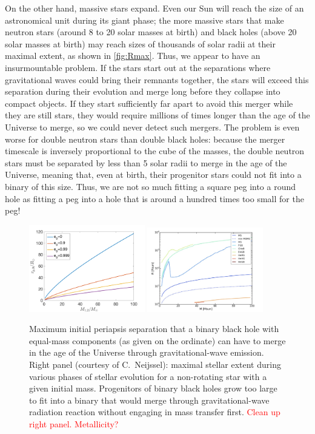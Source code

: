\documentclass[iop,onecolumn]{revtex4}
\newcommand{\todo}[1]{\textcolor{red}{#1}}
\begin{document}
On the other hand, massive stars expand.  Even our Sun will reach the size of an astronomical unit during its giant phase; the more massive stars that make neutron stars (around 8 to 20 solar masses at birth) and black holes (above 20 solar masses at birth) may reach sizes of thousands of solar radii at their maximal extent, as shown in \autoref{fig:Rmax}.  Thus, we appear to have an insurmountable problem.  If the stars start out at the separations where gravitational waves could bring their remnants together, the stars will exceed this separation during their evolution and merge long before they collapse into compact objects. If they start sufficiently far apart to avoid this merger while they are still stars, they would require millions of times longer than the age of the Universe to merge, so we could never detect such mergers.  The problem is even worse for double neutron stars than double black holes: because the merger timescale is inversely proportional to the cube of the masses, the double neutron stars must be separated by less than 5 solar radii to merge in the age of the Universe, meaning that, even at birth, their progenitor stars could not fit into a binary of this size.  Thus, we are not so much fitting a square peg into a round hole as fitting a peg into a hole that is around a hundred times too small for the peg!

\begin{figure}
	\centering
	\includegraphics[width=0.45\textwidth]{M-rp.png}
	\includegraphics[width=0.45\textwidth]{StellarExpansion.png}
	\caption{Maximum initial periapsis separation that a binary black hole with equal-mass components (as given on the ordinate) can have to merge in the age of the Universe through gravitational-wave emission.	\label{fig:periapsis}  Right panel (courtesy of C.~Neijssel): maximal stellar extent during various phases of stellar evolution for a non-rotating star with a given initial mass. \label{fig:Rmax} Progenitors of binary black holes grow too large to fit into a binary that would merge through gravitational-wave radiation reaction without engaging in mass transfer first. \todo{Clean up right panel.  Metallicity?}}
\end{figure}
\end{document}
